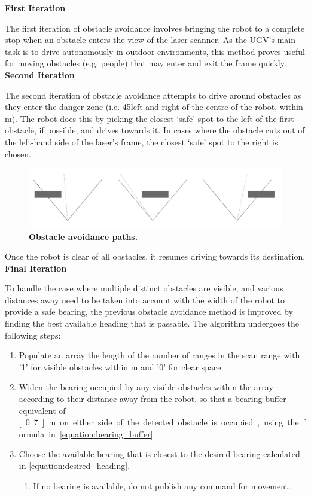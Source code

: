 \documentclass[titlepage,12pt,a4paper]{article}
\begin{document}
\textbf{First Iteration}

The first iteration of obstacle avoidance involves bringing the robot to a complete stop when an obstacle enters the view of the laser scanner. As the UGV's main task is to drive autonomously in outdoor environments, this method proves useful for moving obstacles (e.g. people) that may enter and exit the frame quickly. \\

\textbf{Second Iteration}

The second iteration of obstacle avoidance attempts to drive around obstacles as they enter the danger zone (i.e. 45\degree left and right of the centre of the robot, within \unit[2]{m}). The robot does this by picking the closest `safe' spot to the left of the first obstacle, if possible, and drives towards it. In cases where the obstacle cuts out of the left-hand side of the laser's frame, the closest `safe' spot to the right is chosen. 

\begin{figure}[h]
	\centering
	\includegraphics[scale=0.17]{figures/obstacle2.png}
	\caption{\textbf{Obstacle avoidance paths.}}
\end{figure}

Once the robot is clear of all obstacles, it resumes driving towards its destination. \\

\textbf{Final Iteration}

To handle the case where multiple distinct obstacles are visible, and various distances away need to be taken into account with the width of the robot to provide a safe bearing, the previous obstacle avoidance method is improved by finding the best available heading that is passable. The algorithm undergoes the following steps:

\begin{enumerate}
	\item Populate an array the length of the number of ranges in the scan range with '1' for visible obstacles within \unit[3]{m} and '0' for clear space
	\item Widen the bearing occupied by any visible obstacles within the array according to their distance away from the robot, so that a bearing buffer equivalent of \unit[0.7]{m} on either side of the detected obstacle is occupied, using the formula in \eqref{equation:bearing_buffer}.
	\item Choose the available bearing that is closest to the desired bearing calculated in \eqref{equation:desired_heading}.
	\begin{enumerate}
		\item If no bearing is available, do not publish any command for movement.
	\end{enumerate}
\end{enumerate}
\end{document}
